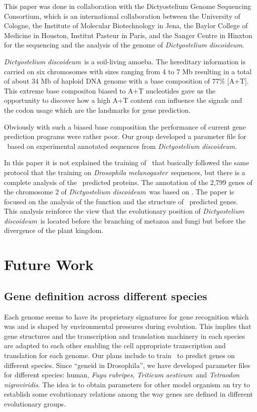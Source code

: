 \documentclass[11pt]{article}
\newcommand{\sctn}[1]{\section{#1}}
\newcommand{\subsctn}[1]{\subsection{#1}}
\def\dicty{\textit{Dictyostelium discoideum}}
\def\fugu{\textit{Fugu rubripes}}
\def\drome{\textit{Drosophila melanogaster}}
\def\tetra{\textit{Tetraodon nigroviridis}}
\def\wheat{\textit{Triticum aestivum}}
\def\geneid{\texttt{geneid}}
\def\geneid{\bold{geneid}}
\begin{document}
This paper was done in collaboration with the Dictyostelium Genome
Sequencing Consortium, which is an international collaboration between
the University of Cologne, the Institute of Molecular Biotechnology in
Jena, the Baylor College of Medicine in Houston, Institut Pasteur in
Paris, and the Sanger Centre in Hinxton for the sequencing and the
analysis of the genome of \dicty. 

\dicty\ is a soil-living amoeba. The hereditary information is carried
on six chromosomes with sizes ranging from 4 to 7 Mb resulting in a
total of about 34 Mb of haploid DNA genome with a base composition of
77\% [A+T]. This extreme base compositon biased to A+T nucleotides
gave us the opportunity to discover how a high A+T content can
influence the signals and the codon usage which are the landmarks for
gene prediction.

Obviously with such a biased base composition the performance of
current gene prediction programs were rather poor. Our group developed
a parameter file for \geneid\ based on experimental annotated
sequences from \dicty.

In this paper it is not explained the training of \geneid\ that
basically followed the same protocol that the training on \drome\
sequences, but there is a complete analysis of the \geneid\ predicted
proteins. The annotation of the 2,799 genes of the chromosome 2 of
\dicty\ was based on \geneid. The paper is focused on the analysis of
the function and the structure of \geneid\ predicted genes. This
analysis reinforce the view that the evolutionary position of \dicty\
is located before the branching of metazoa and fungi but before the
divergence of the plant kingdom.




\sctn{Future Work}

\subsctn{Gene definition across different species}

Each genome seems to have its proprietary signatures for gene
recognition which was and is shaped by environmental pressures during
evolution. This implies that gene structures and the transcription and
translation machinery in each species are adapted to each other
enabling the cell appropriate transcription and translation for each
genome. Our plans include to train \geneid\ to predict genes on
different species.  Since ``geneid in Drosophila'', we have developed
parameter files for different species: human, \fugu, \wheat\ and \tetra.
The idea is to obtain parameters for other model organism an try to
establish some evolutionary relations among the way genes are defined
in different evolutionary groups.
\end{document}
